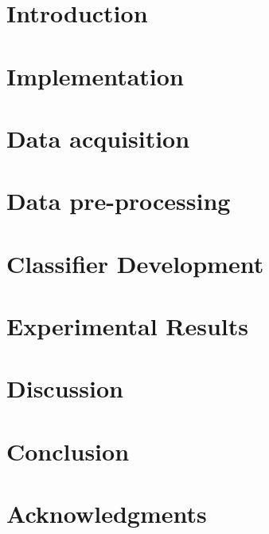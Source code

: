 \documentclass[12pt]{report}
\begin{document}



%
%

\tableofcontents{}
\listoffigures
\listoftables

\chapter{Introduction}



% 

\chapter{Implementation}


\chapter{Data acquisition}
\label{data-acquisition}


\chapter{Data pre-processing}


\chapter{Classifier Development}
\label{classifier-development}


\chapter{Experimental Results}


\chapter{Discussion}


\chapter{Conclusion}


\chapter*{Acknowledgments}
\end{document}
